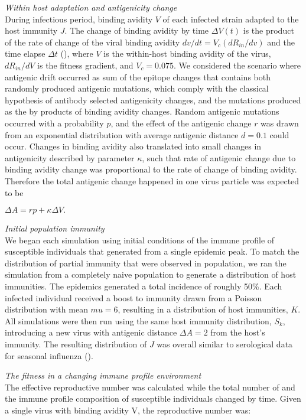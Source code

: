 \documentclass[12pt,a4paper]{article}
\begin{document}
\textit{Within host adaptation and antigenicity change} \\
During infectious period, binding avidity $V$ of each infected strain adapted to the host immunity $J$. The change of binding avidity by time $\Delta V(t)$ is the product of the rate of change of the viral binding avidity $dv/dt =V_{c}(dR_{in}/dv)$ and the time elapse $\Delta t$ (\cite{Yuan2013}), where $V$ is the within-host binding avidity of the virus, $dR_{in}/dV$ is the fitness gradient, and $V_{c}=0.075$. We considered the scenario where antigenic drift occurred as sum of the epitope changes that contains both randomly produced antigenic mutations, which comply with the classical hypothesis of antibody selected antigenicity changes, and the mutations produced as the by products of binding avidity changes. Random antigenic mutations occurred with a probability $p$, and the effect of the antigenic change $r$ was drawn from an exponential distribution with average antigenic distance $d=0.1$ could occur. Changes in binding avidity also translated into small changes in antigenicity described by parameter $\kappa$, such that rate of antigenic change due to binding avidity change was proportional to the rate of change of binding avidity. Therefore the total antigenic change happened in one virus particle was expected to be

$\Delta A=rp+\kappa \Delta V.$


\textit{Initial population immunity} \\
We began each simulation using initial conditions of the immune profile of susceptible individuals that generated from a single epidemic peak. To match the distribution of partial immunity that were observed in population, we ran the simulation from a completely naive population to generate a distribution of host immunities. The epidemics generated a total incidence of roughly 50\%. Each infected individual received a boost to immunity drawn from a Poisson distribution with mean $mu=6$, resulting in a distribution of host immunities, $K$. All simulations were then run using the same host immunity distribution, $S_{k}$, introducing a new virus with antigenic distance $\Delta A=2$ from the host’s immunity. The resulting distribution of $J$ was overall similar to serological data for seasonal influenza (\cite{Yuan2016}).


\textit{The fitness in a changing immune profile environment} \\
The effective reproductive number was calculated while the total number of and the immune profile composition of susceptible individuals changed by time. Given a single virus with binding avidity V, the reproductive number was:
\end{document}
